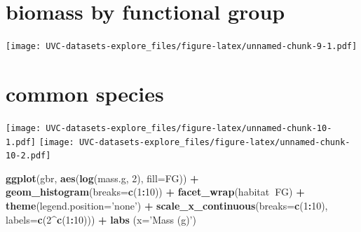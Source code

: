 \documentclass[]{article}
\newenvironment{Shaded}{\begin{snugshade}}{\end{snugshade}}
\newcommand{\KeywordTok}[1]{\textcolor[rgb]{0.13,0.29,0.53}{\textbf{#1}}}
\newcommand{\DataTypeTok}[1]{\textcolor[rgb]{0.13,0.29,0.53}{#1}}
\newcommand{\DecValTok}[1]{\textcolor[rgb]{0.00,0.00,0.81}{#1}}
\newcommand{\StringTok}[1]{\textcolor[rgb]{0.31,0.60,0.02}{#1}}
\newcommand{\OperatorTok}[1]{\textcolor[rgb]{0.81,0.36,0.00}{\textbf{#1}}}
\newcommand{\NormalTok}[1]{#1}
\begin{document}
\begin{Shaded}
\end{Shaded}

\section{biomass by functional group}\label{biomass-by-functional-group}

\texttt{[image: UVC-datasets-explore\_files/figure-latex/unnamed-chunk-9-1.pdf]}

\section{common species}\label{common-species}

\texttt{[image: UVC-datasets-explore\_files/figure-latex/unnamed-chunk-10-1.pdf]}
\texttt{[image: UVC-datasets-explore\_files/figure-latex/unnamed-chunk-10-2.pdf]}

\begin{Shaded}
\begin{Highlighting}[]
\KeywordTok{ggplot}\NormalTok{(gbr, }\KeywordTok{aes}\NormalTok{(}\KeywordTok{log}\NormalTok{(mass.g, }\DecValTok{2}\NormalTok{), }\DataTypeTok{fill=}\NormalTok{FG)) }\OperatorTok{+}\StringTok{ }\KeywordTok{geom_histogram}\NormalTok{(}\DataTypeTok{breaks=}\KeywordTok{c}\NormalTok{(}\DecValTok{1}\OperatorTok{:}\DecValTok{10}\NormalTok{)) }\OperatorTok{+}\StringTok{ }
\StringTok{  }\KeywordTok{facet_wrap}\NormalTok{(habitat}\OperatorTok{~}\NormalTok{FG) }\OperatorTok{+}\StringTok{ }\KeywordTok{theme}\NormalTok{(}\DataTypeTok{legend.position=}\StringTok{'none'}\NormalTok{) }\OperatorTok{+}\StringTok{ }
\StringTok{  }\KeywordTok{scale_x_continuous}\NormalTok{(}\DataTypeTok{breaks=}\KeywordTok{c}\NormalTok{(}\DecValTok{1}\OperatorTok{:}\DecValTok{10}\NormalTok{), }\DataTypeTok{labels=}\KeywordTok{c}\NormalTok{(}\DecValTok{2}\OperatorTok{^}\KeywordTok{c}\NormalTok{(}\DecValTok{1}\OperatorTok{:}\DecValTok{10}\NormalTok{))) }\OperatorTok{+}\StringTok{ }\KeywordTok{labs}\NormalTok{ (}\DataTypeTok{x=}\StringTok{'Mass (g)'}\NormalTok{)}
\end{Highlighting}
\end{Shaded}
\end{document}
